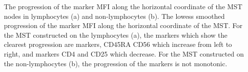 { The progression of the marker MFI along the horizontal coordinate of the \gls{MST} nodes in lymphocytes (a) and non-lymphocytes (b). }
{
  The lowess smoothed progression of the marker MFI along the horizontal coordinate of the \gls{MST}.
  For the \gls{MST} constructed on the lymphocytes (a), the markers which show the clearest progression are markers, CD45RA
  CD56 which increase from left to right,
  and markers CD4 and CD25 which decrease.
  For the \gls{MST} constructed on the non-lymphocytes (b), the progression of the markers is not monotonic.
}



%
%
%
%
%
%
%
%
